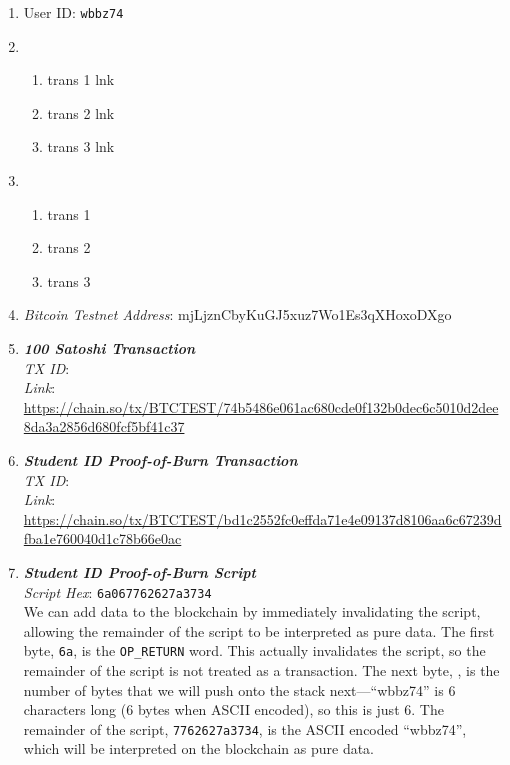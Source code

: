 \documentclass[11pt]{article}
\begin{document}
\begin{enumerate}
\item User ID: \texttt{wbbz74}
\item 
\begin{enumerate}
\item trans 1 lnk
\item trans 2 lnk
\item trans 3 lnk
\end{enumerate}
\item 
\begin{enumerate}
\item trans 1
\item trans 2
\item trans 3
\end{enumerate}

\item \textit{Bitcoin Testnet Address}: mjLjznCbyKuGJ5xuz7Wo1Es3qXHoxoDXgo

\item \textbf{\textit{100 Satoshi Transaction}}\\
\textit{TX ID}: \texttt{}\\
\textit{Link}: \url{https://chain.so/tx/BTCTEST/74b5486e061ac680cde0f132b0dec6c5010d2dee8da3a2856d680fcf5bf41c37}

\item \textbf{\textit{Student ID Proof-of-Burn Transaction}}\\
\textit{TX ID}: \texttt{}\\
\textit{Link}: \url{https://chain.so/tx/BTCTEST/bd1c2552fc0effda71e4e09137d8106aa6c67239dfba1e760040d1c78b66e0ac}

\item \textbf{\textit{Student ID Proof-of-Burn Script}}\\
\textit{Script Hex}: \texttt{6a067762627a3734}\\
We can add data to the blockchain by immediately invalidating the script, allowing the remainder of the script to be interpreted as pure data.
The first byte, \texttt{6a}, is the \texttt{OP\_RETURN} word. This actually invalidates the script, so the remainder of the script is not treated as a transaction.
The next byte, , is the number of bytes that we will push onto the stack next---``wbbz74'' is 6 characters long (6 bytes when ASCII encoded), so this is just 6. 
The remainder of the script, \texttt{7762627a3734}, is the ASCII encoded ``wbbz74'', which will be interpreted on the blockchain as pure data.

\end{enumerate}
\end{document}
